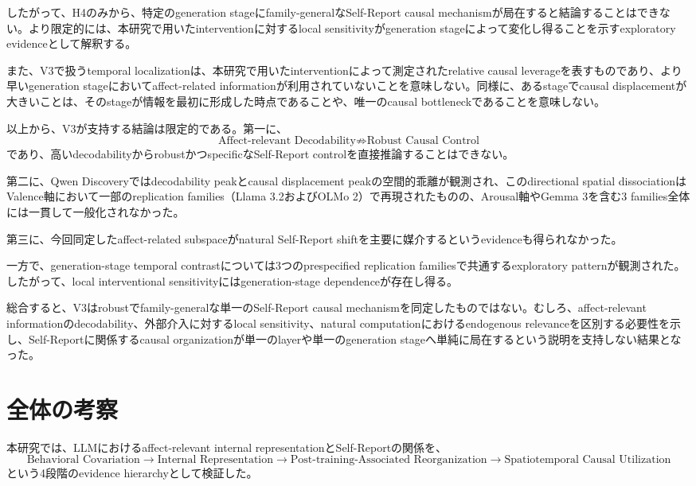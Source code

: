 \documentclass{article} %
\begin{document}
\begin{CJK*}{UTF8}{min}
したがって、H4のみから、特定のgeneration stageにfamily-generalなSelf-Report causal mechanismが局在すると結論することはできない。より限定的には、本研究で用いたinterventionに対するlocal sensitivityがgeneration stageによって変化し得ることを示すexploratory evidenceとして解釈する。

また、V3で扱うtemporal localizationは、本研究で用いたinterventionによって測定されたrelative causal leverageを表すものであり、より早いgeneration stageにおいてaffect-related informationが利用されていないことを意味しない。同様に、あるstageでcausal displacementが大きいことは、そのstageが情報を最初に形成した時点であることや、唯一のcausal bottleneckであることを意味しない。

以上から、V3が支持する結論は限定的である。第一に、
\[
\text{Affect-relevant Decodability}
\not\Rightarrow
\text{Robust Causal Control}
\]
であり、高いdecodabilityからrobustかつspecificなSelf-Report controlを直接推論することはできない。

第二に、Qwen Discoveryではdecodability peakとcausal displacement peakの空間的乖離が観測され、このdirectional spatial dissociationはValence軸において一部のreplication families（Llama 3.2およびOLMo 2）で再現されたものの、Arousal軸やGemma 3を含む3 families全体には一貫して一般化されなかった。

第三に、今回同定したaffect-related subspaceがnatural Self-Report shiftを主要に媒介するというevidenceも得られなかった。

一方で、generation-stage temporal contrastについては3つのprespecified replication familiesで共通するexploratory patternが観測された。したがって、local interventional sensitivityにはgeneration-stage dependenceが存在し得る。

総合すると、V3はrobustでfamily-generalな単一のSelf-Report causal mechanismを同定したものではない。むしろ、affect-relevant informationのdecodability、外部介入に対するlocal sensitivity、natural computationにおけるendogenous relevanceを区別する必要性を示し、Self-Reportに関係するcausal organizationが単一のlayerや単一のgeneration stageへ単純に局在するという説明を支持しない結果となった。

\section{全体の考察}
\label{sec:general-discussion}

本研究では、LLMにおけるaffect-relevant internal representationとSelf-Reportの関係を、
\[
\text{Behavioral Covariation}
\rightarrow
\text{Internal Representation}
\rightarrow
\text{Post-training-Associated Reorganization}
\rightarrow
\text{Spatiotemporal Causal Utilization}
\]
という4段階のevidence hierarchyとして検証した。


\end{CJK*}
\end{document}
